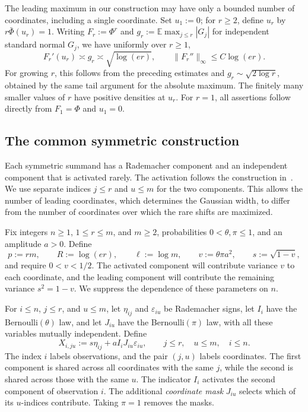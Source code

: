 \documentclass[11pt,letterpaper]{article}
\theoremstyle{remark}
\newcommand{\E}{\mathbb E}
\begin{document}
The leading maximum in our construction may have only a bounded
number of coordinates, including a single coordinate. Set $u_1:=0$;
for $r\ge2$, define $u_r$ by $r\bar\Phi(u_r)=1$.
Writing $F_r:=\Phi^r$ and
$g_r:=\E\max_{j\le r}|G_j|$ for independent standard normal
$G_j$, we have uniformly over $r\ge1$,
\begin{equation}
 F_r'(u_r)\asymp g_r\asymp\sqrt{\log(er)},\qquad
 \|F_r''\|_\infty\le C\log(er).
 \label{lower:eq:leading-density}
\end{equation}
For growing $r$, this follows from the preceding estimates and
$g_r\sim\sqrt{2\log r}$, obtained by the same tail argument
for the absolute maximum. The finitely many smaller values of
$r$ have positive densities at $u_r$. For $r=1$, all assertions
follow directly from $F_1=\Phi$ and $u_1=0$.

\subsection{The common symmetric construction}
\label{app:lower-family}

Each symmetric summand has a Rademacher component and an independent
component that is activated rarely. The activation follows the
construction in~\cite[Proposition~E.1]{FKLZ}. We use separate
indices $j\le r$ and $u\le m$ for the two components. This
allows the number of leading coordinates, which determines the
Gaussian width, to differ from the number of coordinates over
which the rare shifts are maximized.

Fix integers $n\ge1$, $1\le r\le m$, and $m\ge2$,
probabilities $0<\theta,\pi\le1$, and an amplitude $a>0$.
Define
\[
 p:=rm,\qquad R:=\log(er),\qquad \ell:=\log m,\qquad
 v:=\theta\pi a^2,\qquad s:=\sqrt{1-v},
\]
and require $0<v<1/2$. The activated component will contribute
variance $v$ to each coordinate, and the leading component will
contribute the remaining variance $s^2=1-v$. We suppress the
dependence of these parameters on $n$.

For $i\le n$, $j\le r$, and $u\le m$, let $\eta_{ij}$ and
$\varepsilon_{iu}$ be Rademacher signs, let $I_i$ have the
Bernoulli$(\theta)$ law, and let $J_{iu}$ have the
Bernoulli$(\pi)$ law, with all these variables mutually independent.
Define
\begin{equation}
 X_{i,ju}:=s\eta_{ij}+aI_iJ_{iu}\varepsilon_{iu},
 \qquad j\le r,\quad u\le m,\quad i\le n.
 \label{sym:eq:common-construction}
\end{equation}
The index $i$ labels observations, and the pair $(j,u)$ labels
coordinates. The first component is shared across all coordinates
with the same $j$, while the second is shared across those with
the same $u$. The indicator $I_i$ activates the second component
of observation $i$. The additional \emph{coordinate mask} $J_{iu}$
selects which of its $u$-indices contribute. Taking $\pi=1$
removes the masks.
\end{document}
